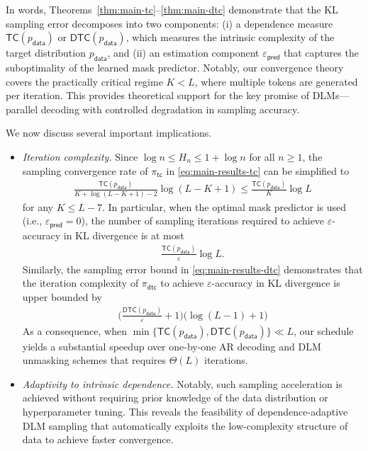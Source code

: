 \documentclass[english]{article}
\newcommand{\data}{\mathsf{data}}
\newcommand{\veps}{\varepsilon}
\newcommand{\TC}{\mathsf{TC}}
\newcommand{\DTC}{\mathsf{DTC}}
\newcommand{\tc}{\mathsf{tc}}
\newcommand{\dtc}{\mathsf{dtc}}
\newcommand{\train}{\mathsf{pred}}
\begin{document}
In words, Theorems~\ref{thm:main-tc}--\ref{thm:main-dtc} demonstrate that the KL sampling error decomposes into two components: (i) a dependence measure $\TC(p_\data)$ or $\DTC(p_\data)$, which measures the intrinsic complexity of the target distribution $p_\data$, and (ii) an estimation component $\varepsilon_{\train}$ that captures the suboptimality of the learned mask predictor.
Notably, our convergence theory covers the practically critical regime $K < L$, where multiple tokens are generated per iteration. This provides theoretical support for the key promise of DLMs---parallel decoding with controlled degradation in sampling accuracy.

We now discuss several important implications.
\begin{itemize}
    \item \textit{Iteration complexity.}
Since $\log n \leq H_n \leq 1 + \log n$ for all $n \geq 1$, the sampling convergence rate of $\pi_\tc$ in \eqref{eq:main-results-tc} can be simplified to
\begin{align*}
    \frac{\TC(p_\data) }{K + \log (L-K+1) - 2}\log (L-K+1)    \leq \frac{\TC(p_\data)  }K\log L 
\end{align*}
for any $K \leq  L-7$.
%
In particular, when the optimal mask predictor is used (i.e., $\veps_{\train} = 0$), the number of sampling iterations required to achieve $\veps$-accuracy in KL divergence is at most
\begin{align*}
 \frac{\TC(p_\data)}{\veps}\log L .
\end{align*}
%
Similarly, the sampling error bound in \eqref{eq:main-results-dtc} demonstrates that the iteration complexity of $\pi_\dtc$ to achieve $\veps$-accuracy in KL divergence is upper bounded by
\begin{align*}
     \bigg(\frac{\DTC(p_\data) }{\veps} +1 \bigg) \big(\log (L-1)+1\big) 
\end{align*}
%
As a consequence, when $\min\{\TC(p_\data), \DTC(p_\data)\} \ll L$, our schedule yields a substantial speedup over one-by-one AR decoding and DLM unmasking schemes that requires $\Theta(L)$ iterations.

\item \textit{Adaptivity to intrinsic dependence.}
Notably, such sampling acceleration is achieved without requiring prior knowledge of the data distribution or hyperparameter tuning. This reveals the feasibility of dependence-adaptive DLM sampling that automatically exploits the low-complexity structure of data to achieve faster convergence.



\end{itemize}
\end{document}
